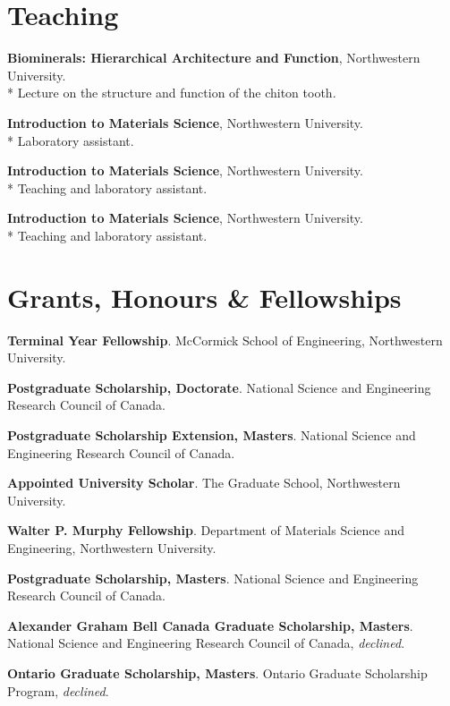 \section*{Teaching}
\textbf{Biominerals: Hierarchical Architecture and Function}, Northwestern University.\\*
\begingroup\setlength{\parskip}{0.1cm}
Lecture on the structure and function of the chiton tooth.

\textbf{Introduction to Materials Science}, Northwestern University.\\*
Laboratory assistant.

\textbf{Introduction to Materials Science}, Northwestern University.\\*
Teaching and laboratory assistant.

\textbf{Introduction to Materials Science}, Northwestern University.\\*
Teaching and laboratory assistant.
\endgroup

\section*{Grants, Honours \& Fellowships}
\textbf{Terminal Year Fellowship}. McCormick School of Engineering, Northwestern University.

\begingroup\setlength{\parskip}{0.1cm}
\textbf{Postgraduate Scholarship, Doctorate}. National Science and Engineering Research Council of Canada.

\textbf{Postgraduate Scholarship Extension, Masters}. National Science and Engineering Research Council of Canada.

\textbf{Appointed University Scholar}. The Graduate School, Northwestern University.

\textbf{Walter P. Murphy Fellowship}. Department of Materials Science and Engineering, Northwestern University.

\textbf{Postgraduate Scholarship, Masters}. National Science and Engineering Research Council of Canada.

\textbf{Alexander Graham Bell Canada Graduate Scholarship, Masters}. National Science and Engineering Research Council of Canada, \emph{declined}.

\textbf{Ontario Graduate Scholarship, Masters}. Ontario Graduate Scholarship Program, \emph{declined}.

